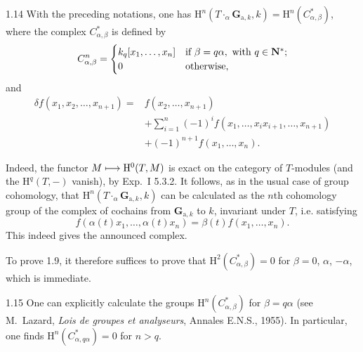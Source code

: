 \begin{lemma}{1.14}\label{XX.1.14}
With the preceding notations, one has $\mathrm H^n(T\cdot_\alpha\mathbf G_{\mathrm a,k},k)=\mathrm H^n(C^*_{\alpha,\beta})$, where the complex $C^*_{\alpha,\beta}$ is defined by
\[
C^n_{\alpha,\beta}=\begin{cases}
k_q[x_1,\ldots,x_n]&\text{if }\beta=q\alpha,\text{ with }q\in\mathbf{N}^*;\\
0&\text{otherwise,}
\end{cases}
\]
and
\[
\begin{split}
\delta f(x_1,x_2,\ldots,x_{n+1})={}&f(x_2,\ldots,x_{n+1})\\
&+\sum_{i=1}^n(-1)^if(x_1,\ldots,x_ix_{i+1},\ldots,x_{n+1})\\
&+(-1)^{n+1}f(x_1,\ldots,x_n).
\end{split}
\]
\end{lemma}
Indeed, the functor $M\longmapsto\mathrm H^0(T,M)$ is exact on the category of $T$-modules (and the $\mathrm H^q(T,-)$ vanish), by Exp.~I 5.3.2. It follows, as in the usual case of group cohomology, that $\mathrm H^n(T\cdot_\alpha\mathbf G_{\mathrm a,k},k)$ can be calculated as the $n$th cohomology group of the complex of cochains from $\mathbf G_{\mathrm a,k}$ to $k$, invariant under $T$, i.e. satisfying
\[
f(\alpha(t)x_1,\ldots,\alpha(t)x_n)=\beta(t)f(x_1,\ldots,x_n).
\]
This indeed gives the announced complex.

To prove 1.9, it therefore suffices to prove that $\mathrm H^2(C^*_{\alpha,\beta})=0$ for $\beta=0$, $\alpha$, $-\alpha$, which is immediate.

\begin{remark}{1.15}\label{XX.1.15}
One can explicitly calculate the groups $\mathrm H^n(C^*_{\alpha,\beta})$ for $\beta=q\alpha$ (see M.~Lazard, \textit{Lois de groupes et analyseurs}, Annales E.N.S., 1955). In particular, one finds $\mathrm H^n(C^*_{\alpha,q\alpha})=0$ for $n>q$.
\end{remark}

